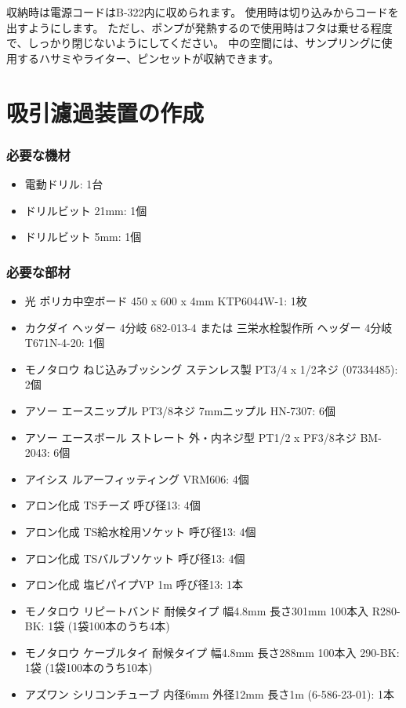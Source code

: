 \documentclass[titlepage,10pt,a4paper]{jsbook}
\begin{document}
収納時は電源コードはB-322内に収められます。
使用時は切り込みからコードを出すようにします。
ただし、ポンプが発熱するので使用時はフタは乗せる程度で、しっかり閉じないようにしてください。
中の空間には、サンプリングに使用するハサミやライター、ピンセットが収納できます。

\section{吸引濾過装置の作成}\label{makingfilteringunit}

\subsubsection{必要な機材}
\begin{itemize}
\item 電動ドリル: 1台
\item ドリルビット 21mm: 1個
\item ドリルビット 5mm: 1個
\end{itemize}

\subsubsection{必要な部材}
\begin{itemize}
\item 光 ポリカ中空ボード 450 x 600 x 4mm KTP6044W-1: 1枚
\item カクダイ ヘッダー 4分岐 682-013-4 または 三栄水栓製作所 ヘッダー 4分岐 T671N-4-20: 1個
\item モノタロウ ねじ込みブッシング ステンレス製 PT3/4 x 1/2ネジ (07334485): 2個
\item アソー エースニップル PT3/8ネジ 7mmニップル HN-7307: 6個
\item アソー エースボール ストレート 外・内ネジ型 PT1/2 x PF3/8ネジ BM-2043: 6個
\item アイシス ルアーフィッティング VRM606: 4個
\item アロン化成 TSチーズ 呼び径13: 4個
\item アロン化成 TS給水栓用ソケット 呼び径13: 4個
\item アロン化成 TSバルブソケット 呼び径13: 4個
\item アロン化成 塩ビパイプVP 1m 呼び径13: 1本
\item モノタロウ リピートバンド 耐候タイプ 幅4.8mm 長さ301mm 100本入 R280-BK: 1袋 (1袋100本のうち4本)
\item モノタロウ ケーブルタイ 耐候タイプ 幅4.8mm 長さ288mm 100本入 290-BK: 1袋 (1袋100本のうち10本)
\item アズワン シリコンチューブ 内径6mm 外径12mm 長さ1m (6-586-23-01): 1本
\end{itemize}
\end{document}

